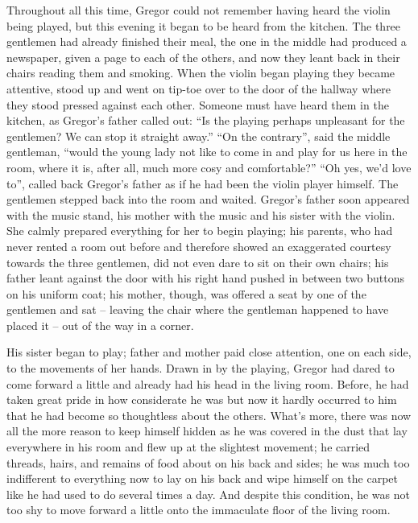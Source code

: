Throughout all this time, Gregor could not remember having heard the
violin being played, but this evening it began to be heard from the
kitchen. The three gentlemen had already finished their meal, the one
in the middle had produced a newspaper, given a page to each of the
others, and now they leant back in their chairs reading them and
smoking. When the violin began playing they became attentive, stood up
and went on tip-toe over to the door of the hallway where they stood
pressed against each other. Someone must have heard them in the
kitchen, as Gregor’s father called out: “Is the playing perhaps
unpleasant for the gentlemen? We can stop it straight away.” “On the
contrary”, said the middle gentleman, “would the young lady not like to
come in and play for us here in the room, where it is, after all, much
more cosy and comfortable?” “Oh yes, we’d love to”, called back
Gregor’s father as if he had been the violin player himself. The
gentlemen stepped back into the room and waited. Gregor’s father soon
appeared with the music stand, his mother with the music and his sister
with the violin. She calmly prepared everything for her to begin
playing; his parents, who had never rented a room out before and
therefore showed an exaggerated courtesy towards the three gentlemen,
did not even dare to sit on their own chairs; his father leant against
the door with his right hand pushed in between two buttons on his
uniform coat; his mother, though, was offered a seat by one of the
gentlemen and sat – leaving the chair where the gentleman happened to
have placed it – out of the way in a corner.

His sister began to play; father and mother paid close attention, one
on each side, to the movements of her hands. Drawn in by the playing,
Gregor had dared to come forward a little and already had his head in
the living room. Before, he had taken great pride in how considerate he
was but now it hardly occurred to him that he had become so thoughtless
about the others. What’s more, there was now all the more reason to
keep himself hidden as he was covered in the dust that lay everywhere
in his room and flew up at the slightest movement; he carried threads,
hairs, and remains of food about on his back and sides; he was much too
indifferent to everything now to lay on his back and wipe himself on
the carpet like he had used to do several times a day. And despite this
condition, he was not too shy to move forward a little onto the
immaculate floor of the living room.

